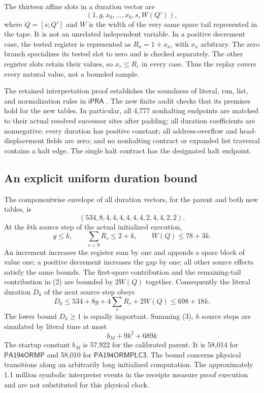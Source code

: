 \documentclass[11pt,a4paper]{article}
\newcommand{\ipra}{\mathsf{iPRA}}
\newcommand{\Mone}{\mathsf{PA194ORMP}}
\newcommand{\Mtwo}{\mathsf{PA194ORMPLC3}}
\begin{document}
The thirteen affine slots in a duration vector are
\[
 (1,g,x_0,\ldots,x_8,s,W(Q')),
\]
where $Q=[s;Q']$ and $W$ is the width of the very same spare tail represented
in the tape. It is not an unrelated independent variable. In a positive
decrement case, the tested register is represented as $R_a=1+x_a$, with
$x_a$ arbitrary. The zero branch specializes its tested slot to zero and
is checked separately. The other register slots retain their values, so
$x_r\le R_r$ in every case. Thus the replay covers every natural value,
not a bounded sample.

The retained interpretation proof establishes the soundness of literal,
run, list, and normalization rules in $\ipra$ \cite{physicalproof}. The
new finite audit checks that its premises hold for the new tables. In
particular, all 4,777 nonhalting endpoints are matched to their actual
resolved successor sites after padding; all duration coefficients are
nonnegative; every duration has positive constant; all address-overflow
and head-displacement fields are zero; and no nonhalting contract or
expanded list traversal contains a halt edge. The single halt contract
has the designated halt endpoint.

\subsection{An explicit uniform duration bound}
The componentwise envelope of all duration vectors, for the parent and
both new tables, is
\[
(534,8,4,4,4,4,4,4,2,4,4,2,2).                    \tag{2}
\]
At the $k$th source step of the actual initialized execution,
\[
 g\le k,\qquad \sum_{r<9}R_r\le2+k,\qquad W(Q)\le78+3k.
\]
An increment increases the register sum by one and appends a spare block
of value one; a positive decrement increases the gap by one; all other
source effects satisfy the same bounds. The first-spare contribution and
the remaining-tail contribution in (2) are bounded by $2W(Q)$ together.
Consequently the literal duration $D_k$ of the next source step obeys
\[
D_k\le534+8g+4\sum_r R_r+2W(Q)\le698+18k.         \tag{3}
\]
The lower bound $D_k\ge1$ is equally important. Summing (3), $k$ source
steps are simulated by literal time at most
\[
\boxed{\quad b_M+9k^2+689k\quad}                  \tag{4}
\]
The startup constant $b_M$ is 57,922 for the calibrated parent.
It is 58,014 for $\Mone$ and 58,010 for $\Mtwo$.
The bound concerns physical transitions along an
arbitrarily long initialized computation. The approximately 1.1 million
symbolic interpreter events in the receipts measure proof execution and
are not substituted for this physical clock.
\end{document}
